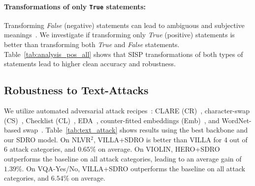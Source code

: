 \paragraph{Transformations of only \texttt{True} statements:}
 
Transforming \textit{False} (negative) statements can lead to ambiguous and subjective meanings~\citep{russell1905denoting}.
We investigate if transforming only \textit{True} (positive) statements is better than transforming both \textit{True} and \textit{False} statements.
Table~\ref{tab:analysis_pos_all} shows that SISP transformations of both types of statements lead to higher clean accuracy and robustness.

\subsection{Robustness to Text-Attacks}


We utilize automated adversarial attack recipes~\citep{morris2020textattack}:
CLARE (CR)~\citep{li2021contextualized}, character-swap (CS)~\citep{pruthi2019combating}, Checklist (CL)~\citep{ribeiro2020beyond}, EDA~\citep{wei2019eda}, counter-fitted embeddings (Emb)~\citep{alzantot2018generating}, and WordNet-based swap~\citep{ren2019generating}.
Table~\ref{tab:text_attack} shows results using the best backbone and our SDRO model.
On NLVR$^2$, VILLA+SDRO is better than VILLA for 4 out of 6 attack categories, and $0.65\%$ on average.
On VIOLIN, HERO+SDRO outperforms the baseline on all attack categories, leading to an average gain of $1.39\%$.
On VQA-Yes/No, VILLA+SDRO outperforms the baseline on all attack categories, and $6.54\%$ on average.

